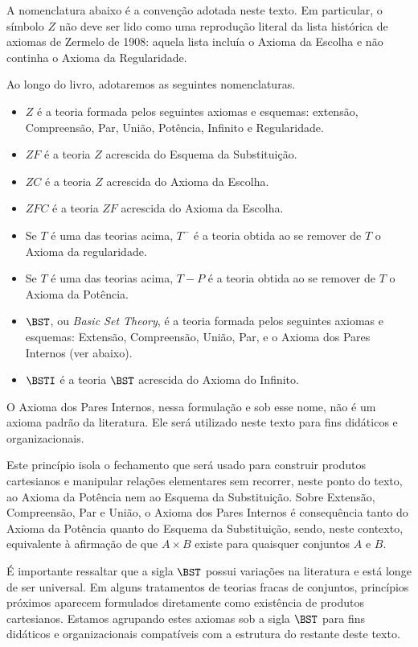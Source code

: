     A nomenclatura abaixo é a convenção adotada neste texto.
    Em particular, o símbolo $Z$ não deve ser lido como uma reprodução literal da lista histórica de axiomas de Zermelo de 1908: aquela lista incluía o Axioma da Escolha e não continha o Axioma da Regularidade.
\begin{metadefinition}
    Ao longo do livro, adotaremos as seguintes nomenclaturas.
    \label{mdef:nomesDasTeorias}
    \begin{itemize}
        \item $Z$ é a teoria formada pelos seguintes axiomas e esquemas: extensão, Compreensão, Par, União, Potência, Infinito e Regularidade.
        \item $ZF$ é a teoria $Z$ acrescida do Esquema da Substituição.
        \item $ZC$ é a teoria $Z$ acrescida do Axioma da Escolha.
        \item $ZFC$ é a teoria $ZF$ acrescida do Axioma da Escolha.
        \item Se $T$ é uma das teorias acima, $T^-$ é a teoria obtida ao se remover de $T$ o Axioma da regularidade.
        \item Se $T$ é uma das teorias acima, $T-P$ é a teoria obtida ao se remover de $T$ o Axioma da Potência.
        \item $\BST$, ou \emph{Basic Set Theory}, é a teoria formada pelos seguintes axiomas e esquemas: Extensão, Compreensão, União, Par, e o Axioma dos Pares Internos (ver abaixo).
        \item $\BSTI$ é a teoria $\BST$ acrescida do Axioma do Infinito.
    \end{itemize}
\end{metadefinition}

O Axioma dos Pares Internos, nessa formulação e sob esse nome, não é um axioma padrão da literatura.
Ele será utilizado neste texto para fins didáticos e organizacionais.

Este princípio isola o fechamento que será usado para construir produtos cartesianos e manipular relações elementares sem recorrer, neste ponto do texto, ao Axioma da Potência nem ao Esquema da Substituição.
Sobre Extensão, Compreensão, Par e União, o Axioma dos Pares Internos é consequência tanto do Axioma da Potência quanto do Esquema da Substituição, sendo, neste contexto, equivalente à afirmação de que $A \times B$ existe para quaisquer conjuntos $A$ e $B$.

É importante ressaltar que a sigla $\BST$ possui variações na literatura e está longe de ser universal.
Em alguns tratamentos de teorias fracas de conjuntos, princípios próximos aparecem formulados diretamente como existência de produtos cartesianos.
Estamos agrupando estes axiomas sob a sigla $\BST$ para fins didáticos e organizacionais compatíveis com a estrutura do restante deste texto.

